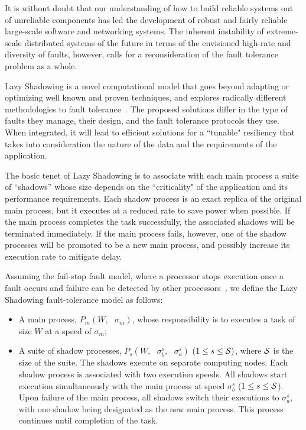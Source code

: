 It is without doubt that our understanding of how to build reliable systems out of unreliable components has led the development of robust and fairly reliable large-scale software and networking systems. The inherent instability of extreme-scale distributed systems of the future in terms of the envisioned high-rate and diversity of faults, however, calls for a reconsideration of the fault tolerance problem as a whole. %

Lazy Shadowing is a novel computational model that goes beyond adapting or optimizing well known and proven techniques, and explores radically different methodologies to fault tolerance~\cite{mills_2014_icnc,mills_2014_pdp,mills2014power}. %
The proposed solutions differ in the type of faults they manage, their design, and the fault tolerance protocols they use. %
When integrated, it will lead to efficient solutions for a ``tunable" resiliency that takes into consideration the nature of the data and the requirements of the application.


The basic tenet of Lazy Shadowing is to associate with each main process a suite of “shadows” whose size depends on the 
``criticality" of the application and its performance requirements. Each shadow process is an exact replica of the original 
main process, but it executes at a reduced rate to save power when possible.
If the main process completes the task successfully, the associated shadows will be terminated immediately. If the main process fails, however, one of the shadow processes will be promoted to be a 
new main process, and possibly increase its execution rate to mitigate delay.

Assuming the fail-stop fault model, where a processor stops execution once a fault
occurs and failure can be detected by other processors~\cite{gartner_faults_1999,cristian_comm_1991}, 
we define the Lazy Shadowing fault-tolerance model as follows:
\begin{itemize}
	\item A main process, $P_m(W,\text{ }\sigma_m)$, whose responsibility is to executes a task of size $W$ at a speed of $\sigma_m$;
	\item A suite of shadow processes, $P_{s}(W,\text{ }\sigma_b^s, \text{ }\sigma_a^s)$ ($1 \le s \le \cal S)$, where $\cal S$ is the size of the suite. The shadows execute on separate computing nodes. Each shadow process is associated with two execution speeds. All shadows start execution simultaneously with the main process at speed $\sigma_b^s$ ($1 \le s \le \cal S$). Upon failure of the main process, all shadows switch their executions to $\sigma_a^s$, with one shadow being designated as the new main process. This process continues until completion of the task.
\end{itemize}

